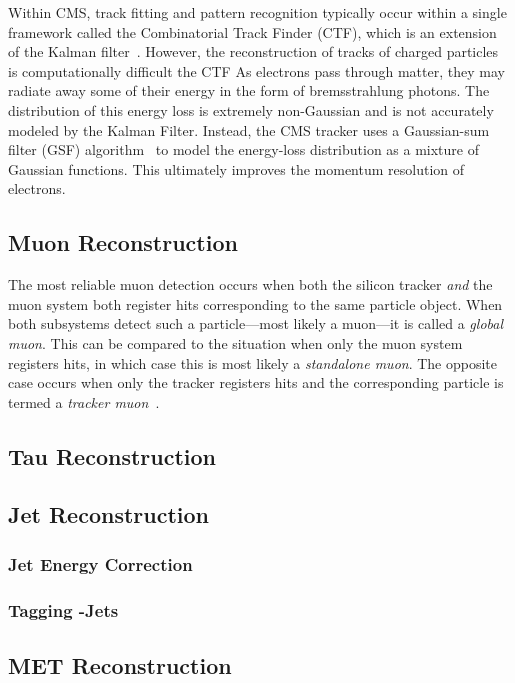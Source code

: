 Within CMS, track fitting and pattern recognition typically occur within a single framework called the Combinatorial Track Finder (CTF), which is an extension of the Kalman filter~\cite{general_track_reco}.
However, the reconstruction of tracks of charged particles is computationally difficult  the CTF 
As electrons pass through matter, they may radiate away some of their energy in the form of bremsstrahlung photons.
The distribution of this energy loss is extremely non-Gaussian and is not accurately modeled by the Kalman Filter.
Instead, the CMS tracker uses a Gaussian-sum filter (GSF) algorithm~\cite{gsf} to model the energy-loss distribution as a mixture of Gaussian functions.
This ultimately improves the momentum resolution of electrons.

\subsection{Muon Reconstruction}
\label{sec:muon_reco}
The most reliable muon detection occurs when both the silicon tracker \emph{and} the muon system both register hits corresponding to the same particle object.
When both subsystems detect such a particle---most likely a muon---it is called a \emph{global muon}.
This can be compared to the situation when only the muon system registers hits, in which case this is most likely a \emph{standalone muon}.
The opposite case occurs when only the tracker registers hits and the corresponding particle is termed a \emph{tracker muon}~\cite{reco_muon}.

\subsection{Tau Reconstruction}
\label{sec:tau_reco}

\subsection{Jet Reconstruction}
\label{sec:jet_reco}
\subsubsection{Jet Energy Correction}
\label{sec:jec}
\subsubsection{Tagging \Pqb-Jets}
\label{sec:btag}

\subsection{MET Reconstruction}
\label{sec:met_reco}
